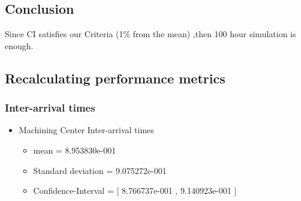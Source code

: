 \documentclass[aps,letterpaper,10pt]{revtex4}
\begin{document}
    \subsection{Conclusion}
        Since CI satisfies our Criteria (1\% from the mean) ,then 100 hour simulation is enough.

    \newpage
    \subsection{Recalculating performance metrics}
        \subsubsection{Inter-arrival times}
            \begin{itemize}
                \item Machining Center Inter-arrival times
                    \begin{itemize}
                        \item mean = 8.953830e-001
                        \item Standard deviation = 9.075272e-001
                        \item Confidence-Interval = [ 8.766737e-001 , 9.140923e-001 ]
                    \end{itemize}
                    \begin{figure}[htp]
                        \begin{center}
\end{center}
\end{figure}
\end{itemize}
\end{document}
